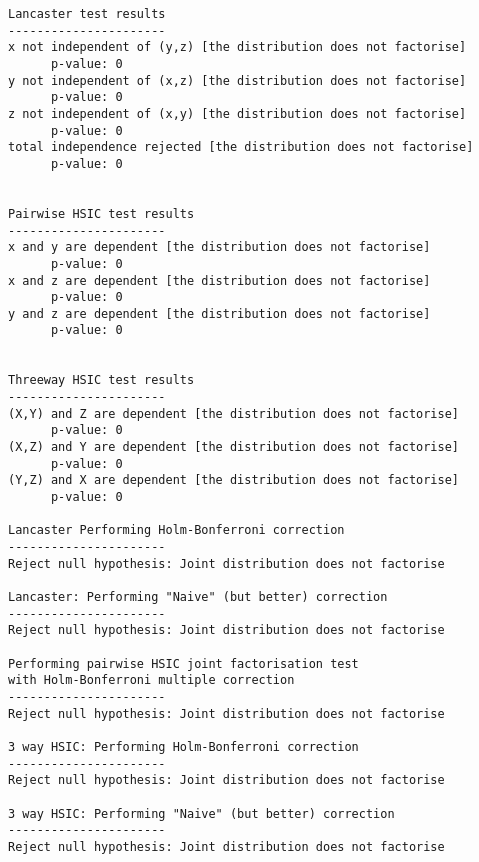 \documentclass[12pt]{article}
\numberwithin{claim}{section}
\numberwithin{lemma}{section}
\numberwithin{theorem}{section}
\begin{document}
\begin{verbatim}
Lancaster test results
----------------------
x not independent of (y,z) [the distribution does not factorise]
      p-value: 0
y not independent of (x,z) [the distribution does not factorise]
      p-value: 0
z not independent of (x,y) [the distribution does not factorise]
      p-value: 0
total independence rejected [the distribution does not factorise]
      p-value: 0


Pairwise HSIC test results
----------------------
x and y are dependent [the distribution does not factorise]
      p-value: 0
x and z are dependent [the distribution does not factorise]
      p-value: 0
y and z are dependent [the distribution does not factorise]
      p-value: 0


Threeway HSIC test results
----------------------
(X,Y) and Z are dependent [the distribution does not factorise]
      p-value: 0
(X,Z) and Y are dependent [the distribution does not factorise]
      p-value: 0
(Y,Z) and X are dependent [the distribution does not factorise]
      p-value: 0

Lancaster Performing Holm-Bonferroni correction
----------------------
Reject null hypothesis: Joint distribution does not factorise

Lancaster: Performing "Naive" (but better) correction
----------------------
Reject null hypothesis: Joint distribution does not factorise

Performing pairwise HSIC joint factorisation test 
with Holm-Bonferroni multiple correction
----------------------
Reject null hypothesis: Joint distribution does not factorise

3 way HSIC: Performing Holm-Bonferroni correction
----------------------
Reject null hypothesis: Joint distribution does not factorise

3 way HSIC: Performing "Naive" (but better) correction
----------------------
Reject null hypothesis: Joint distribution does not factorise

\end{verbatim}

\newpage
\printbibliography
\end{document}
